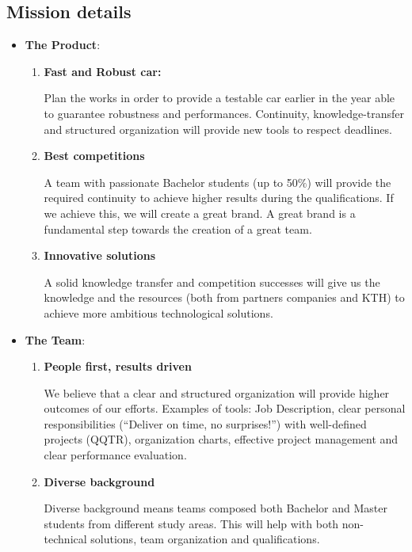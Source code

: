 \documentclass[graybox]{svmult}
\begin{document}
\subsection*{Mission details}
\begin{itemize}
    \item \textbf{The Product}:
    \begin{enumerate}
        \item 	\textbf{Fast and Robust car:}
        
        Plan the works in order to provide a testable car earlier in the year able to guarantee robustness and performances. Continuity, knowledge-transfer and structured organization will provide new tools to respect deadlines.
    
        \item \textbf{Best competitions}
        
        A team with passionate Bachelor students (up to 50$\%$) will provide the required continuity to achieve higher results during the qualifications. If we achieve this, we will create a great brand.
        A great brand is a fundamental step towards the creation of a great team.

        \item \textbf{Innovative solutions}
        
        A solid knowledge transfer and competition successes will give us the knowledge and the resources (both from partners companies and KTH) to achieve more ambitious technological solutions.
    \end{enumerate}
    \item \textbf{The Team}:
    \begin{enumerate}
        \item \textbf{People first, results driven}
        
        We believe that a clear and structured organization will provide higher outcomes of our efforts. Examples of tools: Job Description, clear personal responsibilities (“Deliver on time, no surprises!”) with well-defined projects (QQTR), organization charts, effective project management and clear performance evaluation.
        
        \item \textbf{Diverse background}
        
        Diverse background means teams composed both Bachelor and Master students from different study areas. This will help with both non-technical solutions, team organization and qualifications.


\end{enumerate}
\end{itemize}
\end{document}
